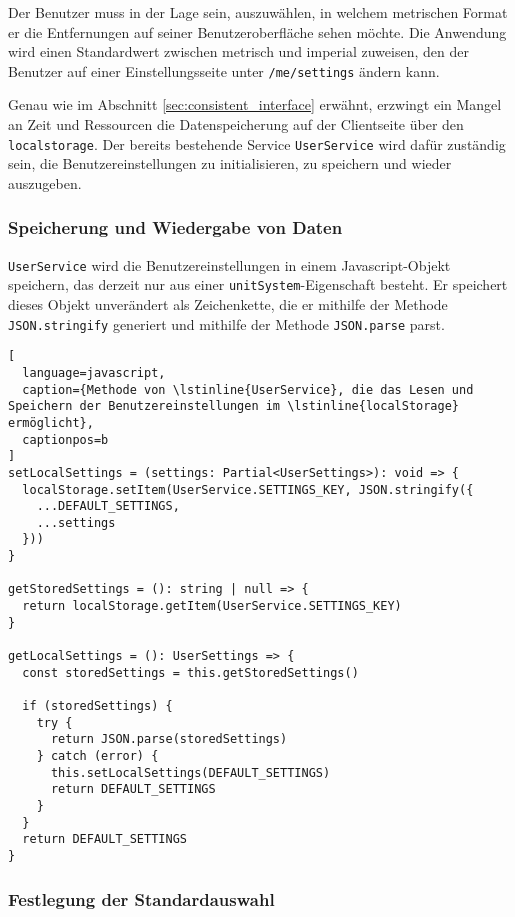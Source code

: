 Der Benutzer muss in der Lage sein, auszuwählen, in welchem metrischen Format er die Entfernungen auf seiner Benutzeroberfläche sehen möchte.
Die Anwendung wird einen Standardwert zwischen metrisch und imperial zuweisen, den der Benutzer auf einer Einstellungsseite unter \lstinline{/me/settings} ändern kann.

Genau wie im Abschnitt \ref{sec:consistent_interface} erwähnt, erzwingt ein Mangel an Zeit und Ressourcen die Datenspeicherung auf der Clientseite über den \lstinline{localstorage}.
Der bereits bestehende Service \lstinline{UserService} wird dafür zuständig sein, die Benutzereinstellungen zu initialisieren, zu speichern und wieder auszugeben.

\subsubsection{Speicherung und Wiedergabe von Daten}

\lstinline{UserService} wird die Benutzereinstellungen in einem Javascript-Objekt speichern, das derzeit nur aus einer \lstinline{unitSystem}-Eigenschaft besteht.
Er speichert dieses Objekt unverändert als Zeichenkette, die er mithilfe der Methode \lstinline{JSON.stringify} generiert und mithilfe der Methode \lstinline{JSON.parse} parst.

\begin{lstlisting}[
  language=javascript,
  caption={Methode von \lstinline{UserService}, die das Lesen und Speichern der Benutzereinstellungen im \lstinline{localStorage} ermöglicht},
  captionpos=b
]
setLocalSettings = (settings: Partial<UserSettings>): void => {
  localStorage.setItem(UserService.SETTINGS_KEY, JSON.stringify({
    ...DEFAULT_SETTINGS,
    ...settings
  }))
}

getStoredSettings = (): string | null => {
  return localStorage.getItem(UserService.SETTINGS_KEY)
}

getLocalSettings = (): UserSettings => {
  const storedSettings = this.getStoredSettings()

  if (storedSettings) {
    try {
      return JSON.parse(storedSettings)
    } catch (error) {
      this.setLocalSettings(DEFAULT_SETTINGS)
      return DEFAULT_SETTINGS
    }
  }
  return DEFAULT_SETTINGS
}
\end{lstlisting}

\subsubsection{Festlegung der Standardauswahl}

